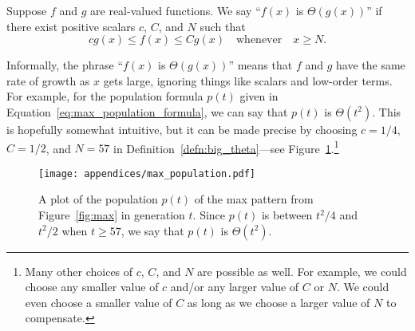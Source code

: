 \begin{definition}\label{defn:big_theta}
	Suppose $f$ and $g$ are real-valued functions. We say ``$f(x)$ is $\Theta(g(x))$'' if there exist positive scalars $c$, $C$, and $N$ such that
	\[
		cg(x) \leq f(x) \leq Cg(x) \quad \text{whenever} \quad x \geq N.
	\]
\end{definition}

Informally, the phrase ``$f(x)$ is $\Theta(g(x))$'' means that $f$ and $g$ have the same rate of growth as $x$ gets large, ignoring things like scalars and low-order terms. For example, for the population formula $p(t)$ given in Equation~\eqref{eq:max_population_formula}, we can say that $p(t)$ is $\Theta(t^2)$. This is hopefully somewhat intuitive, but it can be made precise by choosing $c = 1/4$, $C = 1/2$, and $N = 57$ in Definition~\ref{defn:big_theta}---see Figure~\ref{fig:max_population_graph}.\footnote{Many other choices of $c$, $C$, and $N$ are possible as well. For example, we could choose any smaller value of $c$ and/or any larger value of $C$ or $N$. We could even choose a smaller value of $C$ as long as we choose a larger value of $N$ to compensate.}

\begin{figure}[!htbp]
	\centering
	\texttt{[image: appendices/max\_population.pdf]}
	\caption{A plot of the population $p(t)$ of the max pattern from Figure~\ref{fig:max} in generation $t$. Since $p(t)$ is between $t^2/4$ and $t^2/2$ when $t \geq 57$, we say that $p(t)$ is $\Theta(t^2)$.}\label{fig:max_population_graph}
\end{figure}

